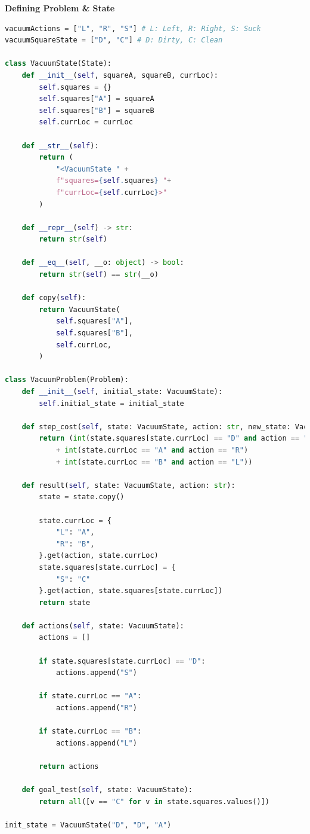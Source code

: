 \vspace{0.5cm}

{\centering \textbf{Defining Problem \& State} \par}

\begin{lstlisting}[language=Python]
vacuumActions = ["L", "R", "S"] # L: Left, R: Right, S: Suck
vacuumSquareState = ["D", "C"] # D: Dirty, C: Clean

class VacuumState(State):
    def __init__(self, squareA, squareB, currLoc):
        self.squares = {}
        self.squares["A"] = squareA
        self.squares["B"] = squareB
        self.currLoc = currLoc

    def __str__(self):
        return (
            "<VacuumState " +
            f"squares={self.squares} "+
            f"currLoc={self.currLoc}>"
        )

    def __repr__(self) -> str:
        return str(self)

    def __eq__(self, __o: object) -> bool:
        return str(self) == str(__o)

    def copy(self):
        return VacuumState(
            self.squares["A"],
            self.squares["B"],
            self.currLoc,
        )

class VacuumProblem(Problem):
    def __init__(self, initial_state: VacuumState):
        self.initial_state = initial_state

    def step_cost(self, state: VacuumState, action: str, new_state: VacuumState):
        return (int(state.squares[state.currLoc] == "D" and action == "S")
            + int(state.currLoc == "A" and action == "R")
            + int(state.currLoc == "B" and action == "L"))

    def result(self, state: VacuumState, action: str):
        state = state.copy()

        state.currLoc = {
            "L": "A",
            "R": "B",
        }.get(action, state.currLoc)
        state.squares[state.currLoc] = {
            "S": "C"
        }.get(action, state.squares[state.currLoc])
        return state

    def actions(self, state: VacuumState):
        actions = []

        if state.squares[state.currLoc] == "D":
            actions.append("S")

        if state.currLoc == "A":
            actions.append("R")

        if state.currLoc == "B":
            actions.append("L")

        return actions

    def goal_test(self, state: VacuumState):
        return all([v == "C" for v in state.squares.values()])

init_state = VacuumState("D", "D", "A")
\end{lstlisting}



